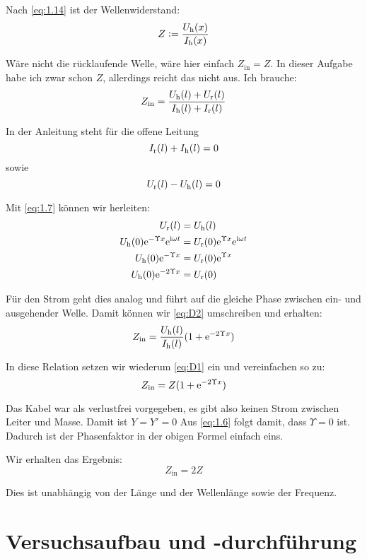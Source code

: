 Nach \eqref{eq:1.14} ist der Wellenwiderstand:
\begin{equation}
	\label{eq:D1}
	Z := \frac{U_\text h(x)}{I_\text h(x)}
\end{equation}

Wäre nicht die rücklaufende Welle, wäre hier einfach $Z_\text{in} = Z$. In
dieser Aufgabe habe ich zwar schon $Z$, allerdings reicht das nicht aus. Ich
brauche:
\begin{equation}
	\label{eq:D2}
	Z_\text{in}
	= \frac{U_\text h (l) + U_\text r (l)}{I_\text h (l) + I_\text r (l)}
\end{equation}

In der Anleitung steht für die offene Leitung
\[
	I_\text r(l) + I_\text h(l) = 0
\]
sowie
\[
	U_\text r(l) - U_\text h(l) = 0
\]

Mit \eqref{eq:1.7} können wir herleiten:
\begin{align*}
	U_\text r(l) &= U_\text h(l) \\
	U_\text h(0) \mathrm e^{-\Upsilon x} \mathrm e^{\mathrm i \omega t} &= U_\text r(0) \mathrm e^{\Upsilon x} \mathrm e^{\mathrm i \omega t} \\
	U_\text h(0) \mathrm e^{-\Upsilon x} &= U_\text r(0) \mathrm e^{\Upsilon x} \\
	U_\text h(0) \mathrm e^{-2 \Upsilon x} &= U_\text r(0) \\
\end{align*}

Für den Strom geht dies analog und führt auf die gleiche Phase zwischen ein-
und ausgehender Welle. Damit können wir \eqref{eq:D2} umschreiben und erhalten:
\[
	Z_\text{in}
	= \frac{U_\text h (l)}{I_\text h (l)} (1 + \mathrm e^{-2 \Upsilon x})
\]

In diese Relation setzen wir wiederum \eqref{eq:D1} ein und vereinfachen so zu:
\[
	Z_\text{in}
	= Z (1 + \mathrm e^{-2 \Upsilon x})
\]

Das Kabel war als verlustfrei vorgegeben, es gibt also keinen Strom zwischen
Leiter und Masse. Damit ist $Y = Y' = 0$ Aus \eqref{eq:1.6} folgt damit, dass
$\Upsilon = 0$ ist. Dadurch ist der Phasenfaktor in der obigen Formel einfach
eins.

Wir erhalten das Ergebnis:
\[
	Z_\text{in} = 2 Z
\]

Dies ist unabhängig von der Länge und der Wellenlänge sowie der Frequenz.


\section{Versuchsaufbau und -durchführung}

